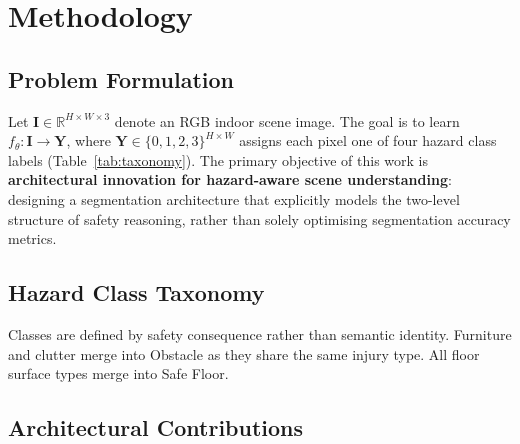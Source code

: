 \section{Methodology}
\label{sec:method}

\subsection{Problem Formulation}

Let $\mathbf{I} \in \mathbb{R}^{H \times W \times 3}$ denote an RGB
indoor scene image. The goal is to learn $f_\theta: \mathbf{I} \to
\mathbf{Y}$, where $\mathbf{Y} \in \{0,1,2,3\}^{H \times W}$ assigns
each pixel one of four hazard class labels (Table~\ref{tab:taxonomy}).
The primary objective of this work is \textbf{architectural innovation
for hazard-aware scene understanding}: designing a segmentation
architecture that explicitly models the two-level structure of safety
reasoning, rather than solely optimising segmentation accuracy metrics.

\subsection{Hazard Class Taxonomy}

\begin{table}[h]
\centering
\caption{Four-Class Indoor Hazard Taxonomy}
\label{tab:taxonomy}
\end{table}

Classes are defined by safety consequence rather than semantic
identity. Furniture and clutter merge into Obstacle as they share
the same injury type. All floor surface types merge into Safe Floor.

\subsection{Architectural Contributions}

